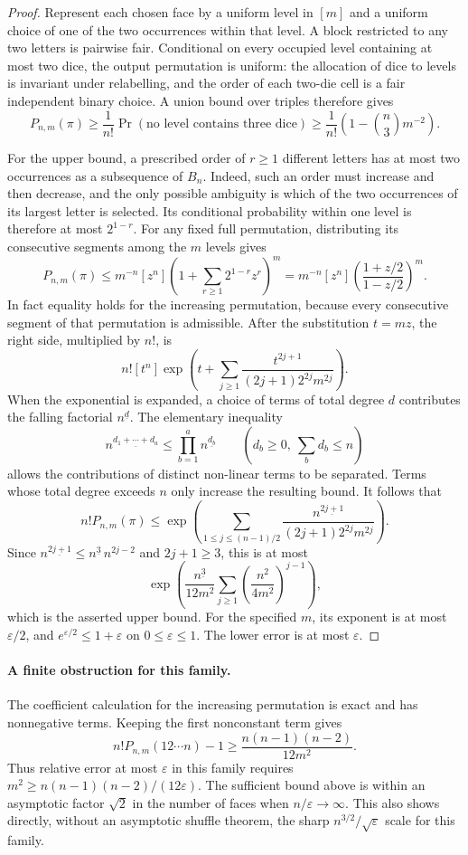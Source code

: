 \documentclass[11pt]{article}
\newcommand{\fall}[2]{#1^{\underline{#2}}}
\begin{document}
\begin{proof}
Represent each chosen face by a uniform level in $[m]$ and a uniform choice
of one of the two occurrences within that level. A block restricted to any
two letters is pairwise fair. Conditional on every occupied level containing
at most two dice, the output permutation is uniform: the allocation of dice
to levels is invariant under relabelling, and the order of each two-die cell
is a fair independent binary choice. A union bound over triples therefore
gives
\[
 P_{n,m}(\pi)\geq\frac1{n!}
 \Pr(\text{no level contains three dice})
 \geq\frac1{n!}\left(1-\binom n3m^{-2}\right).
\]

For the upper bound, a prescribed order of $r\geq1$ different letters has
at most two occurrences as a subsequence of $B_n$. Indeed, such an order
must increase and then decrease, and the only possible ambiguity is which
of the two occurrences of its largest letter is selected. Its conditional
probability within one level is therefore at most $2^{1-r}$.
For any fixed full permutation, distributing its consecutive segments among
the $m$ levels gives
\[
 P_{n,m}(\pi)
 \leq m^{-n}[z^n]
       \left(1+\sum_{r\geq1}2^{1-r}z^r\right)^m
 =m^{-n}[z^n]\left(\frac{1+z/2}{1-z/2}\right)^m.
\]
In fact equality holds for the increasing permutation, because every
consecutive segment of that permutation is admissible.
After the substitution $t=mz$, the right side, multiplied by $n!$, is
\[
 n![t^n]\exp\left(t+
       \sum_{j\geq1}\frac{t^{2j+1}}
                 {(2j+1)2^{2j}m^{2j}}\right).
\]
When the exponential is expanded, a choice of terms of total degree $d$
contributes the falling factorial $\fall nd$. The elementary inequality
\[
 \fall n{d_1+\cdots+d_a}
 \leq\prod_{b=1}^a\fall n{d_b}
 \qquad(d_b\geq0,\ \sum_b d_b\leq n)
\]
allows the contributions of distinct non-linear terms to be separated.
Terms whose total degree exceeds $n$ only increase the resulting bound.
It follows that
\[
 n!P_{n,m}(\pi)\leq
 \exp\left(\sum_{1\leq j\leq(n-1)/2}
 \frac{\fall n{2j+1}}{(2j+1)2^{2j}m^{2j}}\right).
\]
Since $\fall n{2j+1}\leq\fall n3\,n^{2j-2}$ and $2j+1\geq3$, this is at
most
\[
 \exp\left(\frac{\fall n3}{12m^2}
       \sum_{j\geq1}\left(\frac{n^2}{4m^2}\right)^{j-1}\right),
\]
which is the asserted upper bound. For the specified $m$, its exponent is
at most $\varepsilon/2$, and $e^{\varepsilon/2}\leq1+\varepsilon$ on
$0\leq\varepsilon\leq1$. The lower error is at most $\varepsilon$.
\end{proof}

\paragraph{A finite obstruction for this family.}
The coefficient calculation for the increasing permutation is exact and
has nonnegative terms. Keeping the first nonconstant term gives
\[
 n!P_{n,m}(12\cdots n)-1
 \geq\frac{n(n-1)(n-2)}{12m^2}.
\]
Thus relative error at most $\varepsilon$ in this family requires
$m^2\geq n(n-1)(n-2)/(12\varepsilon)$. The sufficient bound above is
within an asymptotic factor $\sqrt2$ in the number of faces when
$n/\varepsilon\to\infty$. This also shows directly, without an asymptotic
shuffle theorem, the sharp $n^{3/2}/\sqrt\varepsilon$ scale for this family.
\end{document}
